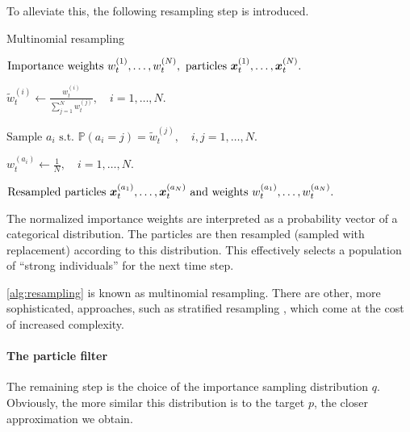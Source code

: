 To alleviate this, the following resampling step is introduced.
\begin{algorithm}[ht]
    \caption{Multinomial resampling}
    \label{alg:resampling}
    \begin{algorithmic}[1]
        \Input $\text{Importance weights } w_t^{(1)}, \ldots, w_t^{(N)},\ \text{particles } \bm{x}_t^{(1)}, \ldots, \bm{x}_t^{(N)}.$
        
        \State $\widetilde{w}_t^{(i)} \gets \frac{w_t^{(i)}}{\sum_{j=1}^N w_t^{(j)}}, \quad i = 1, \ldots, N.$ 
        
        \State $\text{Sample } a_i \text{ s.t. } \mathbb{P}(a_i = j) = \widetilde{w}_t^{(j)}, \quad i,j = 1, \ldots, N.$ 
        
        \State $w_t^{(a_i)} \gets \frac{1}{N}, \quad i = 1, \ldots, N.$ 
        
        \Output $\text{Resampled particles } \bm{x}_t^{(a_1)}, \ldots, \bm{x}_t^{(a_N)} \text{ and weights } w_t^{(a_1)}, \ldots, w_t^{(a_N)}.$
    \end{algorithmic}
\end{algorithm}

The normalized importance weights are interpreted as a probability vector of a categorical distribution. The particles are then resampled (sampled with replacement) according to this distribution. This effectively selects a population of ``strong individuals'' for the next time step.

\autoref{alg:resampling} is known as multinomial resampling. There are other, more sophisticated, approaches, such as stratified resampling \citep{resampling}, which come at the cost of increased complexity.

\paragraph{The particle filter}
The remaining step is the choice of the importance sampling distribution $q$. Obviously, the more similar this distribution is to the target $p$, the closer approximation we obtain.

